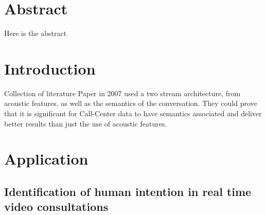 \documentclass[11pt,a4paper]{scrbook}
\begin{document}
\begin{titlepage}
\end{titlepage}

\restoregeometry



\chapter{Abstract}
Here is the abstract


\tableofcontents

\printglossary

\mainmatter
\chapter{Introduction}


{\LARGE Collection of literature} 
\newline
Paper in 2007 used a two stream architecture, from acoustic features, as well as the semantics of the conversation. They could prove that it is significant for Call-Center data to have semantics associated and deliver better results than just the use of acoustic features. \cite{Gupta:2007:Two-StreamER}
\newline











\chapter{Application}
\section{Identification of human intention in real time video consultations}
\end{document}
